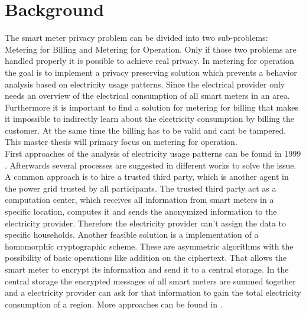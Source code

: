 \documentclass[english,sigconf,11pt]{acmart}
\begin{document}
\section{Background}
The smart meter privacy problem can be divided into two sub-problems: Metering for Billing and Metering for Operation. Only if those two problems are handled properly it is possible to achieve real privacy. In metering for operation the goal is to implement a privacy preserving solution which prevents a behavior analysis based on electricity usage patterns. Since the electrical provider only needs an overview of the electrical consumption of all smart meters in an area.
Furthermore it is important to find a solution for metering for billing that makes it impossible to indirectly learn about the electricity consumption by billing the customer. At the same time the billing has to be valid and cant be tampered. This master thesis will primary focus on metering for operation.\\
First approaches of the analysis of electricity usage patterns can be found in 1999 \cite{795138}.
Afterwards several processes are suggested in different works to solve the issue. A common approach is to hire a trusted third party, which is another agent in the power grid trusted by all participants. The trusted third party act as a computation center, which receives all information from  smart meters in a specific location, computes it and sends the anonymized information to the electricity provider. Therefore the electricity provider can't assign the data to specific households.
Another feasible solution is a implementation of a homomorphic cryptographic scheme. These are asymmetric algorithms with the possibility of basic operations like addition on the ciphertext. That allows the smart meter to encrypt its information and send it to a central storage. In the central storage the encrypted messages of all smart meters are summed together and a electricity provider can ask for that information to gain the total electricity consumption of a region. More approaches can be found in \citep{fan2012smart}\citep{finster2015privacy}.
\end{document}
